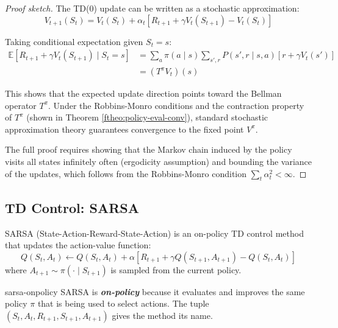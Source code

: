 \documentclass[a4paper, 11pt]{article}
\numberwithin{equation}{section}
\theoremstyle{plain}
\theoremstyle{definition}
\newcommand{\E}{{\mathbb E}}
\newcommand{\1}{{\mathbbm 1}}
\newcommand{\bi}[1]{\textbf{\textit{#1}}}
\begin{document}
	\begin{proof}[Proof sketch]
		The TD(0) update can be written as a stochastic approximation:
		\begin{equation*}
			V_{t+1}(S_t) = V_t(S_t) + \alpha_t [R_{t+1} + \gamma V_t(S_{t+1}) - V_t(S_t)]
		\end{equation*}
		
		Taking conditional expectation given $S_t = s$:
		\begin{equation*}
			\begin{split}
				\E[R_{t+1} + \gamma V_t(S_{t+1})\;|\; S_t = s] &= \sum_a \pi(a\;|\; s) \sum_{s', r} P(s', r\;|\; s, a) [r + \gamma V_t(s')]\\
				&= (T^{\pi} V_t)(s)
			\end{split}
		\end{equation*}
		
		This shows that the expected update direction points toward the Bellman operator $T^{\pi}$. Under the Robbins-Monro conditions and the contraction property of $T^{\pi}$ (shown in Theorem \ref{ftheo:policy-eval-conv}), standard stochastic approximation theory guarantees convergence to the fixed point $V^{\pi}$.
		
		The full proof requires showing that the Markov chain induced by the policy visits all states infinitely often (ergodicity assumption) and bounding the variance of the updates, which follows from the Robbins-Monro condition $\sum_t \alpha_t^2 < \infty$.
	\end{proof}
	
	\subsection{TD Control: SARSA}
	
	SARSA (State-Action-Reward-State-Action) is an on-policy TD control method that updates the action-value function:
	\begin{equation}\label{sarsa-update}
		Q(S_t, A_t) \leftarrow Q(S_t, A_t) + \alpha [R_{t+1} + \gamma Q(S_{t+1}, A_{t+1}) - Q(S_t, A_t)]
	\end{equation}
	where $A_{t+1} \sim \pi(\cdot\;|\; S_{t+1})$ is sampled from the current policy.
	
	\begin{frema}{}{sarsa-onpolicy}
		SARSA is \bi{on-policy} because it evaluates and improves the same policy $\pi$ that is being used to select actions. The tuple $(S_t, A_t, R_{t+1}, S_{t+1}, A_{t+1})$ gives the method its name.
	\end{frema}
	
\end{document}
